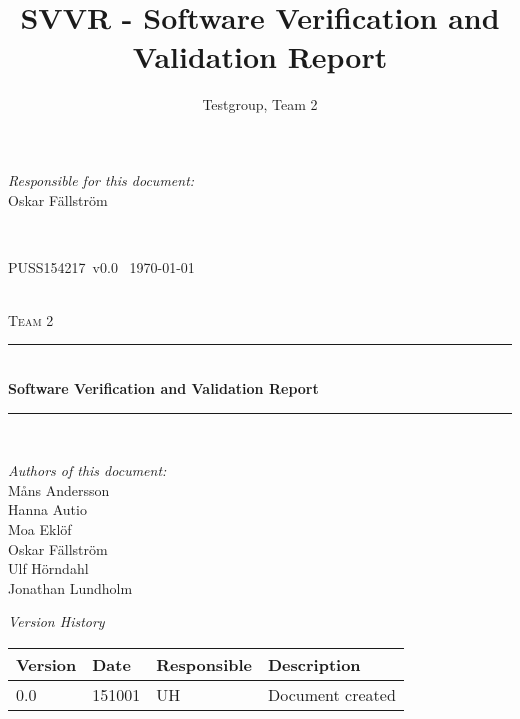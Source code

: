 \documentclass[a4paper]{article}
\title{SVVR - Software Verification and Validation Report}
\author{Testgroup, Team 2}
\newcommand{\version}{v0.0}
\newcommand{\SVVR}{PUSS154217}
\begin{document}
\begin{titlepage}
\newcommand{\HRule}{\rule{\linewidth}{0.5mm}}

\begin{minipage}{0.5\textwidth}
\begin{flushleft} %
\textit{Responsible for this document:}\\
Oskar Fällström %
\end{flushleft}
\end{minipage}
~
\begin{minipage}{0.4\textwidth}
\begin{flushright}
\SVVR\ \version\ %
\today
\end{flushright}
\end{minipage}\\[3cm]

\centering
\textsc{\LARGE Team 2}\\[0.5cm]

\HRule \\[0.4cm]
{ \huge \bfseries Software Verification and Validation Report}\\[0.4cm] %
\HRule \\[1.5cm]

\vfill
\begin{flushleft}
\textit{Authors of this document:}\\
Måns Andersson \\
Hanna Autio \\
Moa Eklöf \\
Oskar Fällström \\
Ulf Hörndahl \\
Jonathan Lundholm
\end{flushleft}


\end{titlepage}

\begin{center}
\textit{\large Version History}

    \begin{tabular}{ | l | l | l | p{5cm} |}
    \hline
    \textbf{Version}		& \textbf{Date}		& \textbf{Responsible}					& \textbf{Description}					\\ \hline
    0.0						& 151001 			& UH									& Document created						\\ \hline
    \end{tabular}
\end{center}
\end{document}
